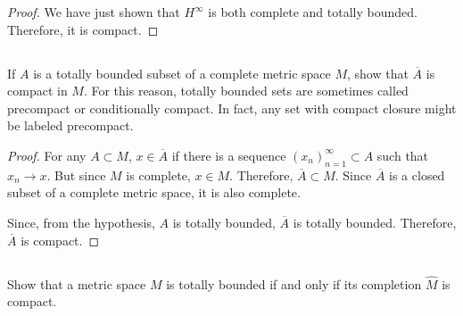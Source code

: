 \begin{proof}
\vspace{1em}

We have just shown that $H^\infty$ is both complete and totally bounded. Therefore, it is compact.

\end{proof}

\subsection{} If $A$ is a totally bounded subset of a complete metric space $M$, show that $\overline{A}$ is compact in $M$. For this reason, totally bounded sets are sometimes called precompact or conditionally compact. In fact, any set with compact closure might be labeled precompact.

\begin{proof}
For any $A \subset M$, $x \in \overline{A}$ if there is a sequence $(x_n)_{n=1}^\infty \subset A$ such that $x_n \rightarrow x$. But since $M$ is complete, $x \in M$. Therefore, $\overline{A} \subset M$. Since $\overline{A}$ is a closed subset of a complete metric space, it is also complete.

Since, from the hypothesis, $A$ is totally bounded, $\overline{A}$ is totally bounded. Therefore, $\overline{A}$ is compact.
\end{proof}

\subsection{} Show that a metric space $M$ is totally bounded if and only if its completion $\hat{M}$ is compact. 

